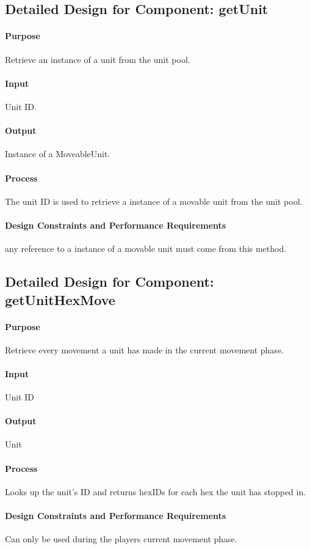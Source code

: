 \documentclass[12pt,a4paper,titlepage]{article}
\begin{document}
\subsection{Detailed Design for Component: getUnit}
\paragraph{Purpose} Retrieve an instance of a unit from the unit pool.
\paragraph{Input}  Unit ID.
\paragraph{Output} Instance of a MoveableUnit.
\paragraph{Process} The unit ID is used to retrieve a instance of a movable unit from the unit pool.
\paragraph{Design Constraints and Performance Requirements} any reference to a instance of a movable unit must come from this method.

\subsection{Detailed Design for Component: getUnitHexMove}
\paragraph{Purpose} Retrieve every movement a unit has made in the current movement phase.
\paragraph{Input} Unit ID
\paragraph{Output} Unit
\paragraph{Process} Looks up the unit's ID and returns hexIDs for each hex the unit has stopped in.
\paragraph{Design Constraints and Performance Requirements} Can only be used during the players current movement phase.
\end{document}
